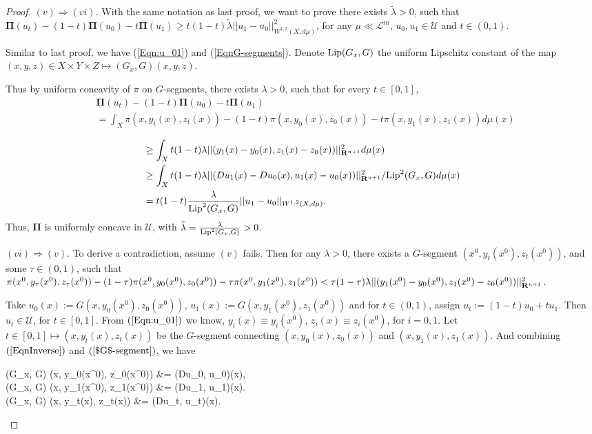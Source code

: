 \begin{proof}
	$(v)\Rightarrow (vi).$ With the same notation as last proof, we want to prove there exists  
	$\tilde{\lambda}>0$, such that $\pmb \Pi(u_t) - (1-t) \pmb \Pi(u_0) - t\pmb \Pi(u_1)\ge t(1-t)\tilde{\lambda}||u_1-u_0||^2_{W^{1,2}(X,d\mu)}$, for any $\mu\ll \mathcal{L}^m$, $u_0, u_1 \in \mathcal{U}$ and $t\in (0,1)$. 
	
	Similar to last proof, we have (\ref{Eqn:u_01}) and (\ref{EqnG-segments}). Denote $\Lip(G_x,G)$ the uniform Lipschitz constant of the map $(x,y,z)\in X\times Y\times Z \longmapsto (G_x,G)(x,y,z)$.

	Thus by uniform concavity of $\pi$ on $G$-segments, there exists  
	$\lambda>0$, such that for every $t \in [0,1]$,
	\begin{align*}
	&\pmb \Pi (u_t)-(1-t)\pmb \Pi (u_0)- t \pmb \Pi(u_1)\\
	&= \int_X \pi(x, y_t(x), z_t(x)) - (1-t)\pi(x, y_0(x), z_0(x)) - t\pi(x, y_1(x), z_1(x)) d \mu (x)\\
	\end{align*}
	\begin{align*}
	&\ge \int_{X} t(1-t)\lambda||(y_1(x)-y_0(x),z_1(x)-z_0(x))||^2_{\R^{n+1}} d\mu (x)\\
	&\ge \int_{X} t(1-t)\lambda||(Du_1(x)-Du_0(x),u_1(x)-u_0(x))||^2_{\R^{n+1}}/{\Lip}^2(G_x,G) d\mu (x)\\
	&= t(1-t)\frac{\lambda}{\Lip^2(G_x,G)} ||u_1-u_0||_{W^{1,2}(X,d\mu)}.
	\end{align*}
	Thus, $\pmb \Pi $ is uniformly concave in $\mathcal{U}$, with $\tilde{\lambda} = \frac{\lambda}{\Lip^2(G_x,G)} >0$.
	
	$(vi)\Rightarrow (v).$ To derive a contradiction, assume $(v)$ fails.  Then for any $\lambda>0$, there exists a $G$-segment $(x^0, y_t(x^0), z_t(x^0))$, and some $\tau \in (0,1)$, such that $\pi(x^0, y_{\tau}(x^0), z_{\tau}(x^0)) -  (1-\tau)\pi(x^0, y_{0}(x^0),z_{0}(x^0))-\tau \pi(x^0, y_{1}(x^0), z_{1}(x^0)) < \tau (1-\tau)\lambda ||(y_{1}(x^0)-y_{0}(x^0), z_{1}(x^0)-z_{0}(x^0))||^2_{{\mathbf R}^{n+1}}$.
	
	Take $u_0(x) := G(x, y_{0}(x^0), z_{0}(x^0))$, $u_1(x):= G(x, y_{1}(x^0), z_{1}(x^0))$ and for $t\in (0,1)$, assign $u_{t} := (1-t)u_0 +t u _1$. Then $ u_{t} \in \mathcal{U}$, for $t \in [0,1]$.  From $(\ref{Eqn:u_01})$ we know, $y_i(x)\equiv y_i(x^0)$, $z_i(x)\equiv z_i(x^0)$, for $i=0,1$.  Let $t\in [0,1] \longmapsto (x, y_t(x), z_t(x))$ be the $G$-segment connecting $(x, y_0(x), z_0(x))$ and $(x, y_1(x), z_1(x))$. And combining $(\ref{EqnInverse})$ and $(\ref{$G$-segment})$, we have
	\begin{flalign*}
	(G_x, G) (x, y_{0}(x^0), z_{0}(x^0)) &= (Du_0, u_0)(x),\\
	(G_x, G) (x, y_{1}(x^0), z_{1}(x^0)) &= (Du_1, u_1)(x).\\
	(G_x, G) (x, y_{t}(x), z_{t}(x)) &= (Du_{t}, u_{t})(x).
	\end{flalign*}
	

\end{proof}
